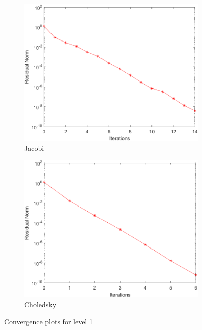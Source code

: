 \documentclass[a4paper, 11pt]{article}
\begin{document}
				\begin{figure}[H]
					\begin{subfigure}{.49\textwidth}
						\centering
						\includegraphics[width=.99\linewidth]{img1/J.png}  
						\caption{Jacobi}
						\label{fig:Jacobi_1}
					\end{subfigure}
					\begin{subfigure}{.49\textwidth}
						\centering
						\includegraphics[width=.99\linewidth]{img1/C.png}  
						\caption{Choledsky}
						\label{fig:Chol_1}
					\end{subfigure}
					\caption{Convergence plots for level 1}
					\label{fig:fig1}
				\end{figure}
			
\end{document}
